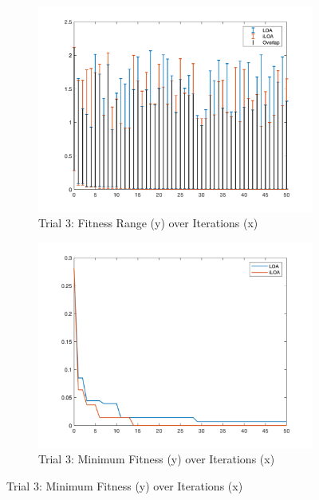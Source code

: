 \begin{figure}
  \begin{subfigure}[b]{0.4\textwidth}
    \includegraphics[width=\textwidth]{img/bars/f2/3}
    \caption{ \scriptsize Trial 3: Fitness Range (y) over Iterations (x)}
    \label{fig:f2-b-3}
  \end{subfigure}
  \begin{subfigure}[b]{0.4\textwidth}
    \includegraphics[width=\textwidth]{img/fits/f2/3}
    \caption{ \scriptsize Trial 3: Minimum Fitness (y) over Iterations (x)}
    \label{fig:f2-f-3}
  \end{subfigure}


\end{figure}
